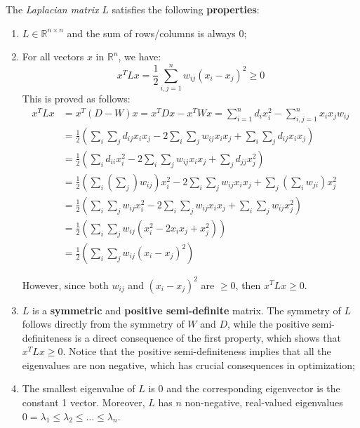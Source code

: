 The \textit{Laplacian matrix} $L$ satisfies the following \textbf{properties}:
\begin{enumerate}
        \item $L \in \mathbb{R}^{n \times n}$ and the sum of rows/columns is always 0;
	\item For all vectors $x$ in $\mathbb{R}^n$, we have:
	$$x ^ T L x = \frac { 1 } { 2 } \sum _ { i, j = 1 } ^ { n } w _ { i j } \left( x _ { i } - x _ { j } \right) ^ { 2 } \geq 0$$
	This is proved as follows:
	$$\begin{aligned} 
	x ^ { T } L x & = x^T (D-W) x = x ^ { T } D x - x ^ { T } W x = \sum _ { i=1 }^n d _ { i } x _ { i } ^ { 2 } - \sum _ { i , j =1 }^n x _ { i } x _ { j } w _ { i j } \\ 
	& = \frac{1}{2} \left( \sum_i \sum_j d_{ij} x_i x_j - 2 \sum_i \sum_j w_{ij} x_i x_j + \sum_i \sum_j d_{ij} x_i x_j \right) \\ 
        & = \frac{1}{2} \left( \sum_i d_{ii} x_i^2 - 2 \sum_i \sum_j w_{ij} x_i x_j + \sum_j d_{jj} x_j^2 \right) \\
        & = \frac{1}{2} \left( \sum_i (\sum_j) w_{ij} \right) x_i^2 - 2 \sum_i \sum_j w_{ij} x_i x_j + \sum_j (\sum_i w_{ji}) x_j^2 \\
        & = \frac{1}{2} \left( \sum_i \sum_j w_{ij}x_i^2 - 2 \sum_i \sum_j w_{ij}x_i x_j + \sum_i \sum_j w_{ij} x_j^2 \right) \\
        & = \frac{1}{2} \left( \sum_i \sum_j w_{ij} (x_i^2 - 2 x_i x_j + x_j^2) \right) \\
        & = \frac{1}{2} \left( \sum_i \sum_j w_{ij} (x_i - x_j)^2 \right)

	\end{aligned}$$

        However, since both $w_{ij}$ and $(x_i - x_j)^2$ are $\geq 0$, then $x^TLx \geq 0$.
	 
	\item $L$ is a \textbf{symmetric} and \textbf{positive semi-definite} matrix. The symmetry of $L$ follows directly from the symmetry of $W$ and $D$, while the positive semi-definiteness is a direct consequence of the first property, which shows that $x ^ { T } L x \geq 0$. Notice that the positive semi-definiteness implies that all the eigenvalues are non negative, which has crucial consequences in optimization;
	 
	\item The smallest eigenvalue of $L$ is 0 and the corresponding eigenvector is the constant 1 vector. Moreover, $L$ has $n$ non-negative, real-valued eigenvalues $0 = \lambda _ { 1 } \leq \lambda _ { 2 } \leq \ldots \leq \lambda _ { n }$.
 
\end{enumerate}

